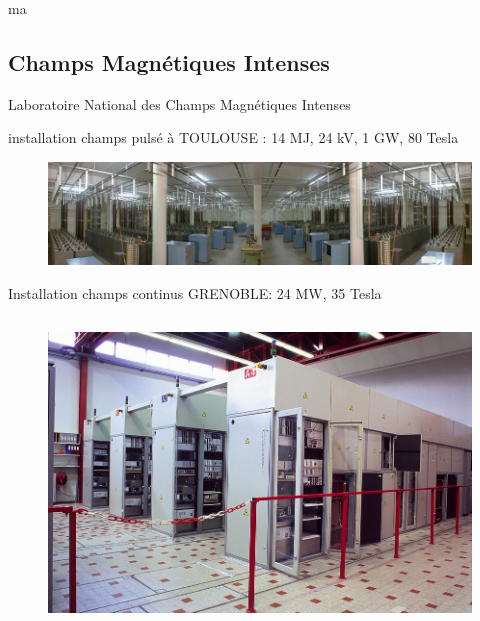 ma\subsection{Champs Magnétiques Intenses}

\begin{frame}{Laboratoire National des Champs Magn\'etiques Intenses}

   installation champs pulsé à  TOULOUSE : 14 MJ, 24 kV, 1 GW,  80 Tesla
   \vskip-0.3cm
   \begin{figure}[H]
    \centering
    \includegraphics[scale=0.3]{Figures/cmi/powersupply_pulsed.png}
   \end{figure}

   Installation champs continus  GRENOBLE: 24 MW,  35  Tesla
   \vskip-0.3cm

 \begin{columns}[c]
  \begin{column}{8cm}
   \begin{figure}[H]
    \centering
    \includegraphics[scale=0.2]{Figures/cmi/powersupply.png}
   \end{figure}
  \end{column}


\end{columns}
\end{frame}
